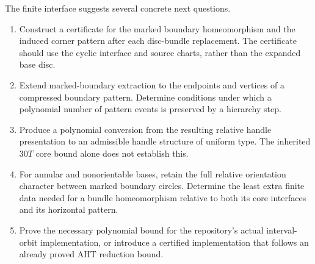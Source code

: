 The finite interface suggests several concrete next questions.
\begin{enumerate}
\item Construct a certificate for the marked boundary homeomorphism and
  the induced corner pattern after each disc-bundle replacement.  The
  certificate should use the cyclic interface and source charts, rather
  than the expanded base disc.
\item Extend marked-boundary extraction to the endpoints and vertices of
  a compressed boundary pattern.  Determine conditions under which a
  polynomial number of pattern events is preserved by a hierarchy step.
\item Produce a polynomial conversion from the resulting relative
  handle presentation to an admissible handle structure of uniform type.
  The inherited $30T$ core bound alone does not establish this.
\item For annular and nonorientable bases, retain the full relative
  orientation character between marked boundary circles.  Determine the
  least extra finite data needed for a bundle homeomorphism relative to
  both its core interfaces and its horizontal pattern.
\item Prove the necessary polynomial bound for the repository's actual
  interval-orbit implementation, or introduce a certified implementation
  that follows an already proved AHT reduction bound.
\end{enumerate}
